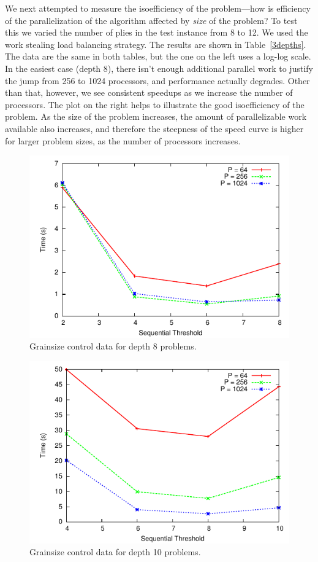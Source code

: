\documentclass[times, 10pt,twocolumn]{article}
\begin{document}
We next attempted to measure the isoefficiency of the problem---how is efficiency of the parallelization of the
algorithm affected by {\em size} of the problem?  To test this we varied the number of plies in the test instance from
8 to 12. We used the work stealing load balancing strategy.  The results are shown in Table~\ref{3depths}.  The data are
the same in both tables, but the one on the left uses a log-log scale.  In the easiest case (depth 8), there isn't
enough additional parallel work to justify the jump from 256 to 1024 processors, and performance actually degrades.
Other than that, however, we see consistent speedups as we increase the number of processors.  The plot on the right helps to
illustrate the good isoefficiency of the problem.  As the size of the problem increases, the amount of parallelizable
work available also increases, and therefore the steepness of the speed curve is higher for larger problem sizes, as the
number of processors increases.
 
\begin{figure}[h]
\centering
\includegraphics[width=0.6\columnwidth]{plots/dep8.pdf}
\caption{Grainsize control data for depth 8 problems.}
\label{dep8}
\end{figure}
 
\begin{figure}[h]
\centering
\includegraphics[width=0.6\columnwidth]{plots/dep10.pdf}
\caption{Grainsize control data for depth 10 problems.}
\label{dep10}
\end{figure}
 
\end{document}
